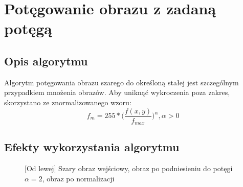 \documentclass[a4paper,12pt, titlepage]{report}
\begin{document}
\section{Potęgowanie obrazu z zadaną potęgą}
\subsection*{Opis algorytmu}
\par Algorytm potęgowania obrazu szarego do określoną stałej jest szczególnym przypadkiem mnożenia obrazów. Aby uniknąć wykroczenia poza zakres, skorzystano ze znormalizowanego wzoru: \[f_{m}=255*\Big(\frac{f(x,y)}{f_{max}}\Big)^{\alpha},  \alpha>0\]
\subsection*{Efekty wykorzystania algorytmu}
\begin{figure}[h]
    \centering
    \caption{[Od lewej] Szary obraz wejściowy, obraz po podniesieniu do potęgi \(\alpha=2\), obraz po normalizacji}%
    \label{fig:rysunek}%
\end{figure}
\end{document}
